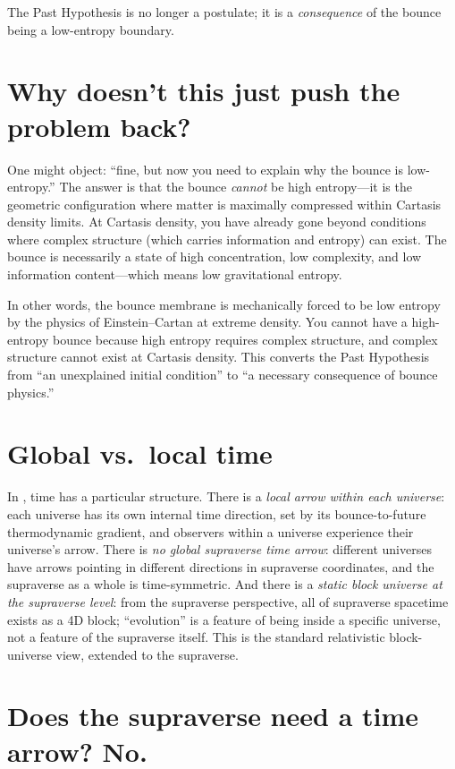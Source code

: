 The Past Hypothesis is no longer a postulate; it is a \emph{consequence} of the
bounce being a low-entropy boundary.

\section{Why doesn't this just push the problem back?}
\label{sec:forced-low-entropy}

One might object: ``fine, but now you need to explain why the bounce is
low-entropy.'' The answer is that the bounce \emph{cannot} be high entropy---it
is the geometric configuration where matter is maximally compressed within
Cartasis density limits. At Cartasis density, you have already gone beyond
conditions where complex structure (which carries information and entropy) can
exist. The bounce is necessarily a state of high concentration, low complexity,
and low information content---which means low gravitational entropy.

In other words, the bounce membrane is mechanically forced to be low entropy by
the physics of Einstein--Cartan at extreme density. You cannot have a
high-entropy bounce because high entropy requires complex structure, and complex
structure cannot exist at Cartasis density. This converts the Past Hypothesis
from ``an unexplained initial condition'' to ``a necessary consequence of bounce
physics.''

\section{Global vs.\ local time}

In \SCT, time has a particular structure. There is a \emph{local arrow within
each universe}: each universe has its own internal time direction, set by its
bounce-to-future thermodynamic gradient, and observers within a universe
experience their universe's arrow. There is \emph{no global supraverse time
arrow}: different universes have arrows pointing in different directions in
supraverse coordinates, and the supraverse as a whole is time-symmetric. And
there is a \emph{static block universe at the supraverse level}: from the
supraverse perspective, all of supraverse spacetime exists as a 4D block;
``evolution'' is a feature of being inside a specific universe, not a feature of
the supraverse itself. This is the standard relativistic block-universe view,
extended to the supraverse.

\section{Does the supraverse need a time arrow? No.}
\label{sec:no-supraverse-arrow}

